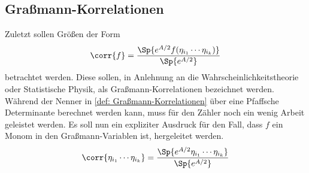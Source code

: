 \subsection{Graßmann-Korrelationen}

Zuletzt sollen Größen der Form 
\begin{equation} \label{def: Graßmann-Korrelationen}
\corr{f} = \frac{\Sp{e^{A/2} f(\eta_{i_1} \cdots \eta_{i_k})}}{\Sp{e^{A/2}}} 
\end{equation}
betrachtet werden. Diese sollen, in  Anlehnung an die Wahrscheinlichkeitstheorie oder Statistische Physik, als Graßmann-Korrelationen bezeichnet werden. Während der Nenner in \eqref{def: Graßmann-Korrelationen} über eine Pfaffsche Determinante berechnet werden kann, muss für den Zähler noch ein wenig Arbeit geleistet werden. Es soll nun ein expliziter Ausdruck für den Fall, dass $f$ ein Monom in den Graßmann-Variablen ist, hergeleitet werden.
\begin{equation} \label{def: Graßmann-Korrelationen monom}
\corr{\eta_{i_1} \cdots \eta_{i_k}} = \frac{\Sp{e^{A/2}\eta_{i_1} \cdots \eta_{i_k}}}{\Sp{e^{A/2}}} 
\end{equation}

